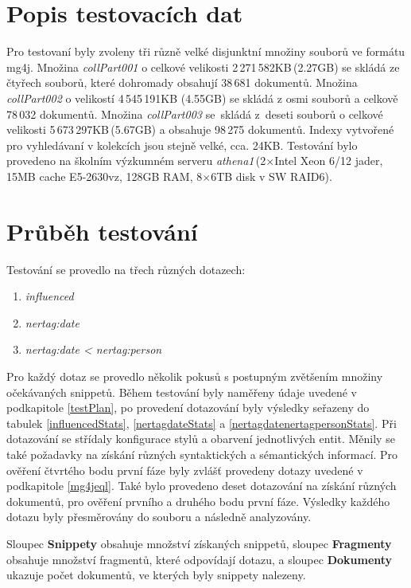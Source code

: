 \section{Popis testovacích dat}

Pro testovaní byly zvoleny tři různě velké disjunktní množiny souborů ve formátu mg4j. Množina \emph{collPart001} o celkové velikosti 2\,271\,582KB\,(2.27GB)  se skládá ze čtyřech souborů, které dohromady obsahují 38\,681 dokumentů. Množina \emph{collPart002} o velikostí 4\,545\,191KB (4.55GB) se skládá z osmi souborů a celkově 78\,032 dokumentů. Množina \emph{collPart003} se~skládá z~deseti souborů o celkové velikosti 5\,673\,297KB\,(5.67GB) a obsahuje 98\,275 dokumentů. Indexy vytvořené pro vyhledávaní v kolekcích jsou stejně velké, cca. 24KB. Testování bylo provedeno na školním výzkumném serveru \emph{athena1}\,(2$\times$Intel Xeon 6/12 jader, 15MB cache E5-2630vz, 128GB RAM, 8$\times$6TB disk v SW RAID6).

\section{Průběh testování}
Testování se provedlo na třech různých dotazech: 
\begin{enumerate}
\item \emph{influenced}

\item \emph{nertag:date}

\item \emph{nertag:date < nertag:person}
\end{enumerate} 
Pro každý dotaz se provedlo několik pokusů s postupným zvětšením množiny očekávaných snippetů. Během testování byly naměřeny údaje uvedené v podkapitole \ref{testPlan}, po provedení dotazování byly výsledky seřazeny do tabulek \ref{influencedStats}, \ref{nertagdateStats} a \ref{nertagdatenertagpersonStats}. Při dotazování se střídaly konfigurace stylů a obarvení jednotlivých entit. Měnily se také požadavky na získání různých syntaktických a sémantických informací. Pro ověření čtvrtého bodu první fáze byly zvlášť provedeny dotazy uvedené v podkapitole \ref{mg4jeql}. Také bylo provedeno deset dotazování na získání různých dokumentů, pro ověření prvního a druhého bodu první fáze. Výsledky každého dotazu byly přesměrovány do souboru a následně analyzovány. 


Sloupec \textbf{Snippety} obsahuje množství získaných snippetů, sloupec \textbf{Fragmenty} obsahuje množství fragmentů, které odpovídají dotazu, a  sloupec \textbf{Dokumenty} ukazuje počet dokumentů, ve kterých byly snippety nalezeny.  

